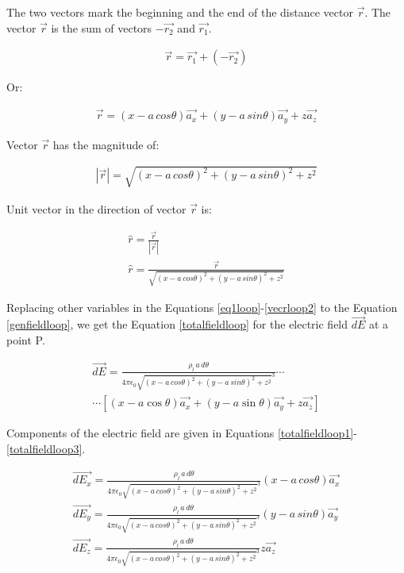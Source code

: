 \documentclass{ximera}
\begin{document}
The two vectors mark the beginning and the end of the distance vector $\vec{r}$. The vector  $\vec{r}$ is the sum of vectors $-\vec{r_2}$ and $\vec{r_1}$. 



\begin{eqnarray}
\vec{r}=\vec{r_1} + (-\vec{r_2})
\end{eqnarray}

Or:

\begin{eqnarray}
\vec{r}= (x -  a \,cos{\theta}) \vec{a_x} +(y - a \,sin{\theta}) \vec{a_y} +z \vec{a_z}
\end{eqnarray}

Vector $\vec{r}$ has the magnitude of:


\begin{eqnarray}
|\vec{r}|= \sqrt{(x - a \,cos{\theta})^2 +(y - a \,sin{\theta})^2 +z ^2}\label{vecrloop1}
\end{eqnarray}

Unit vector in the direction of vector $\vec{r}$ is:


\begin{eqnarray}
\hat{r}= \frac{\vec{r}}{|\vec{r}|} \\
\hat{r}=\frac{\vec{r}}{\sqrt{(x - a \, cos{\theta})^2 +(y - a  \, sin{\theta})^2 +z^2}}\label{vecrloop2}
\end{eqnarray}


Replacing other variables in the Equations \ref{eq1loop}-\ref{vecrloop2} to the Equation \ref{genfieldloop}, we get the    Equation \ref{totalfieldloop} for the electric field $\vec{dE}$ at a point P.

\begin{eqnarray}
\vec{dE}= \frac{\rho_l \, a \, d\theta }{4 \pi \epsilon_{0} {  \sqrt{(x - a \,cos{\theta})^2 +(y - a \,sin{\theta})^2 +z ^2}  }^3} \cdots  \nonumber \\ \cdots \left[(x-a\cos\theta)\vec{a_x}+(y-a\sin\theta)\vec{a_y}+z\vec{a_z}\right] \label{totalfieldloop}
\end{eqnarray}

Components of the electric field are given in Equations \ref{totalfieldloop1}-\ref{totalfieldloop3}.


\begin{eqnarray}
\vec{dE_x}= \frac{\rho_l \, a \, d\theta }{4 \pi \epsilon_{0} {  \sqrt{(x - a \,cos{\theta})^2 +(y - a \,sin{\theta})^2 +z ^2}  }^3}   (x -  a \,cos{\theta}) \vec{a_x}  \label{totalfieldloop1} \\
\vec{dE_y}= \frac{\rho_l \, a \, d\theta }{4 \pi \epsilon_{0} {  \sqrt{(x - a \,cos{\theta})^2 +(y - a \,sin{\theta})^2 +z ^2}  }^3}   (y - a \,sin{\theta}) \vec{a_y}  \label{totalfieldloop2} \\
\vec{dE_z}= \frac{\rho_l \, a \, d\theta }{4 \pi \epsilon_{0} {  \sqrt{(x - a \,cos{\theta})^2 +(y - a \,sin{\theta})^2 +z ^2}  }^3}   z \vec{a_z} \label{totalfieldloop3}
\end{eqnarray}
\end{document}
